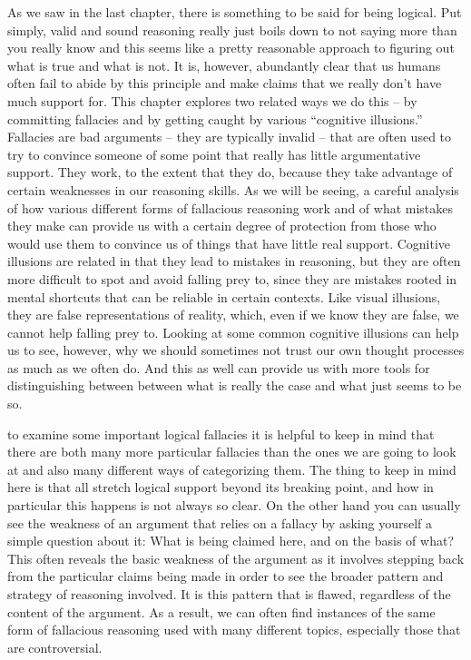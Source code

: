 \documentclass[justified]{tufte-book}
\begin{document}
 As we saw in the last chapter, there is something to be said for being logical. Put simply, valid and sound reasoning really just boils down to not saying more than you really know and this seems like a pretty reasonable approach to figuring out what is true and what is not. It is, however, abundantly clear that us humans often fail to abide by this principle and make claims that we really don't have much support for. This chapter explores two related ways we do this -- by committing fallacies and by getting caught by various ``cognitive illusions.'' Fallacies are bad arguments -- they are typically invalid -- that are often used to try to convince someone of some point that really has little argumentative support. They work, to the extent that they do, because they take advantage of certain weaknesses in our reasoning skills. As we will be seeing, a careful analysis of how various different forms of fallacious reasoning work and of what mistakes they make can provide us with a certain degree of protection from those who would use them to convince us of things that have little real support. Cognitive illusions are related in that they lead to mistakes in reasoning, but they are often more difficult to spot and avoid falling prey to, since they are mistakes rooted in mental shortcuts that can be reliable in certain contexts. Like visual illusions, they are false representations of reality, which, even if we know they are false, we cannot help falling prey to. Looking at some common cognitive illusions can help us to see, however, why we should sometimes not trust our own thought processes as much as we often do. And this as well can provide us with more tools for distinguishing between between what is really the case and what just seems to be so.

 to examine some important logical fallacies it is helpful to keep in mind that there are both many more particular fallacies than the ones we are going to look at and also many different ways of categorizing them. The thing to keep in mind here is that all stretch logical support beyond its breaking point, and how in particular this happens is not always so clear. On the other hand you can usually see the weakness of an argument that relies on a fallacy by asking yourself a simple question about it: What is being claimed here, and on the basis of what? This often reveals the basic weakness of the argument as it involves stepping back from the particular claims being made in order to see the broader pattern and strategy of reasoning involved. It is this pattern that is flawed, regardless of the content of the argument. As a result, we can often find instances of the same form of fallacious reasoning used with many different topics, especially those that are controversial.
\end{document}
